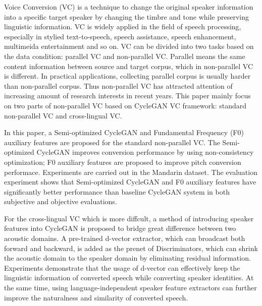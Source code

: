 \begin{enabstract}
  Voice Conversion (VC) is a technique to change the original speaker information 
  into a specific target speaker by changing the timbre and tone while preserving 
  linguistic information. VC is widely applied in the field of speech processing, 
  especially in stylied text-to-speech, speech assistance, speech enhancement, 
  multimeida entertainment and so on. VC can be divided into two tasks based on the 
  data condition: parallel VC and non-parallel VC. Parallel means the same content
  information between source and target corpus, which in non-parallel VC is different.
  In practical applications, collecting parallel corpus is usually harder than non-parallel
  corpus. Thus non-parallel VC has attracted attention of increasing amount of research 
  interests in recent years. This paper mainly focus on two parts of non-parallel VC based
  on CycleGAN VC framework: standard non-parallel VC and cross-lingual VC.

  In this paper, a Semi-optimized CycleGAN and Fundamental Frequency (F0) auxiliary features are
  proposed for the standard non-parallel VC. The Semi-optimized CycleGAN improves conversion 
  performance by using non-consistency optimization; F0 auxiliary features are proposed 
  to improve pitch conversion performace. Experiments are carried out in the Mandarin dataset. 
  The evaluation experiment shows that Semi-optimized CycleGAN and F0 auxiliary features have 
  significantly better performance than baseline CycleGAN system in both subjective and objective
  evaluations.

  For the cross-lingual VC which is more diffcult, a method of introducing speaker features into 
  CycleGAN is proposed to bridge great difference between two acoustic domains. A pre-trained d-vector 
  extractor, which can broadcast both forward and backward, is added as the prenet of Discriminators, 
  which can shrink the acoustic domain to the speaker domain by eliminating residual information.
  Experiments demonstrate that the usage of d-vector can effectively keep the linguistic
  information of converted speech while converting speaker identities. At the same time, 
  using language-independent speaker feature extractors can further improve the naturalness and similarity 
  of converted speech.


\end{enabstract}
